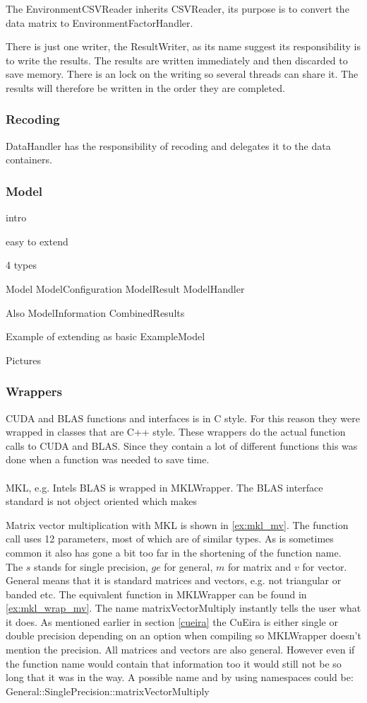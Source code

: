 \documentclass[10pt,a4paper]{report}
\begin{document}
The EnvironmentCSVReader inherits CSVReader, its purpose is to convert the data matrix to EnvironmentFactorHandler.

There is just one writer, the ResultWriter, as its name suggest its responsibility is to write the results. The results are written immediately and then discarded to save memory. There is an lock on the writing so several threads can share it. The results will therefore be written in the order they are completed. 


\subsubsection{Recoding}
DataHandler has the responsibility of recoding and delegates it to the data containers. 

\subsubsection{Model}
intro

easy to extend

4 types

Model
ModelConfiguration
ModelResult
ModelHandler

Also
ModelInformation
CombinedResults

Example of extending as basic ExampleModel

Pictures

\subsubsection{Wrappers}
CUDA and BLAS functions and interfaces is in C style. For this reason they were wrapped in classes that are C++ style. These wrappers do the actual function calls to CUDA and BLAS. Since they contain a lot of different functions this was done when a function was needed to save time.\\
\\
MKL, e.g. Intels BLAS is wrapped in MKLWrapper. The BLAS interface standard is not object oriented which makes %

Matrix vector multiplication with MKL is shown in \ref{ex:mkl_mv}. The function call uses 12 parameters, most of which are of similar types. As is sometimes common it also has gone a bit too far in the shortening of the function name. The $s$ stands for single precision, $ge$ for general, $m$ for matrix and $v$ for vector. General means that it is standard matrices and vectors, e.g. not triangular or banded etc. The equivalent function in MKLWrapper can be found in \ref{ex:mkl_wrap_mv}. The name matrixVectorMultiply instantly tells the user what it does. As mentioned earlier in section \ref{cueira} the CuEira is either single or double precision depending on an option when compiling so MKLWrapper doesn't mention the precision. All matrices and vectors are also general. However even if the function name would contain that information too it would still not be so long that it was in the way. A possible name and by using namespaces could be:\\
General::SinglePrecision::matrixVectorMultiply\\
\end{document}
